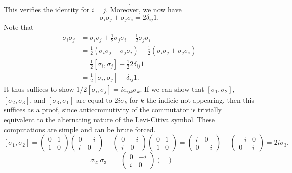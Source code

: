 \documentclass[11pt, letterpaper]{article}
\begin{document}
\begin{enumerate}
\[		.\]
		This verifies the identity for $i=j$. Moreover, we now have
		\[
			\sigma_i\sigma_j+\sigma_j\sigma _i=2\delta_{ij} 1
		.\]
		Note that
		\begin{align*}
			\sigma _i\sigma _j&=\sigma _i\sigma _j+\frac{1}{2} \sigma _j\sigma _i-\frac{1}{2} \sigma _j\sigma _i\\
					  &=\frac{1}{2} \left( \sigma _i\sigma _j-\sigma _j\sigma _i \right) +\frac{1}{2} \left( \sigma _i\sigma _j+\sigma _j\sigma _i \right)\\
					  &=\frac{1}{2} \left[ \sigma _i,\sigma _j \right] +\frac{1}{2} 2\delta_{ij} 1\\
					  &=\frac{1}{2} \left[ \sigma _i,\sigma _j \right] +\delta_{ij} 1
		.\end{align*}
		It thus suffices to show $1/2 \left[ \sigma _i,\sigma _j \right] =ie_{ijk} \sigma _k$. If we can show that $\left[ \sigma_1,\sigma _2 \right] $, $\left[ \sigma _2,\sigma _3 \right] $, and $\left[ \sigma _3,\sigma _1 \right] $ are equal to $2i\sigma_k$ for $k$ the indicie not appearing, then this suffices as a proof, since anticommutivity of the commutator is trivially equivalent to the alternating nature of the Levi-Citiva symbol. These computations are simple and can be brute forced.
		\[
			\left[ \sigma _1,\sigma _2 \right] =\begin{pmatrix}
			0 & 1 \\
			1 & 0
			\end{pmatrix}\begin{pmatrix}
			0 & -i \\
			i & 0
			\end{pmatrix}-\begin{pmatrix}
			0 & -i \\
			i & 0
			\end{pmatrix}\begin{pmatrix}
			0 & 1 \\
			1 & 0
			\end{pmatrix}=\begin{pmatrix}
			i & 0 \\
			0 & -i
			\end{pmatrix}-\begin{pmatrix}
			-i & 0 \\
			0 & i
			\end{pmatrix}=2i\sigma_3
		.\]
		\[
			\left[ \sigma _2,\sigma _3 \right] =\begin{pmatrix}
			0 & -i \\
			i & 0
			\end{pmatrix}\begin{pmatrix}

\end{pmatrix}\]
\end{enumerate}
\end{document}
